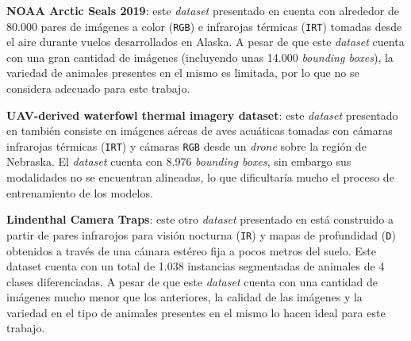 \documentclass[12pt,a4paper]{report}
\begin{document}
\textbf{NOAA Arctic Seals 2019}: este \textit{dataset} presentado en \cite{noaa_alaska_fisheries_2021} cuenta con alrededor de 80.000 pares de imágenes a color (\texttt{RGB}) e infrarojas térmicas (\texttt{IRT}) tomadas desde el aire durante vuelos desarrollados en Alaska. A pesar de que este \textit{dataset} cuenta con una gran cantidad de imágenes (incluyendo unas 14.000 \textit{bounding boxes}), la variedad de animales presentes en el mismo es limitada, por lo que no se considera adecuado para este trabajo.

\textbf{UAV-derived waterfowl thermal imagery dataset}: este \textit{dataset} presentado en \cite{uav_waterfowl_thermal_2021} también consiste en imágenes aéreas de aves acuáticas tomadas con cámaras infrarojas térmicas (\texttt{IRT}) y cámaras \texttt{RGB} desde un \textit{drone} sobre la región de Nebraska. El \textit{dataset} cuenta con 8.976 \textit{bounding boxes}, sin embargo sus modalidades no se encuentran alineadas, lo que dificultaría mucho el proceso de entrenamiento de los modelos.

\textbf{Lindenthal Camera Traps}: este otro \textit{dataset} presentado en \cite{haucke2021exploitingdepthinformationwildlife} está construido a partir de pares infrarojos para visión nocturna (\texttt{IR}) y mapas de profundidad (\texttt{D}) obtenidos a través de una cámara estéreo fija a pocos metros del suelo. Este dataset cuenta con un total de 1.038 instancias segmentadas de animales de 4 clases diferenciadas. A pesar de que este \textit{dataset} cuenta con una cantidad de imágenes mucho menor que los anteriores, la calidad de las imágenes y la variedad en el tipo de animales presentes en el mismo lo hacen ideal para este trabajo.
\end{document}
